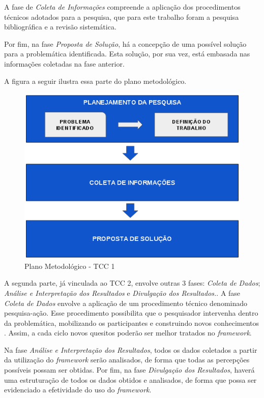 A fase de \textit{Coleta de Informações} compreende a aplicação dos procedimentos técnicos adotados para a pesquisa, que para este trabalho foram a pesquisa bibliográfica e a revisão sistemática.

Por fim, na fase \textit{Proposta de Solução}, há a concepção de uma possível solução para a problemática identificada. Esta solução, por sua vez, está embasada nas informações coletadas na fase anterior.

A figura a seguir ilustra essa parte do plano metodológico.

\begin{figure}[h]
\includegraphics[width=\textwidth]{figuras/planometodologico1.png}
\caption{Plano Metodológico - TCC 1}
\end{figure}

A segunda parte, já vinculada ao TCC 2, envolve outras 3 fases: \textit{Coleta de Dados}; \textit{Análise e Interpretação dos Resultados} e \textit{Divulgação dos Resultados.}.
A fase \textit{Coleta de Dados} envolve a aplicação de um procedimento técnico denominado pesquisa-ação. Esse procedimento possibilita que o pesquisador intervenha dentro da problemática, mobilizando os participantes e construindo novos conhecimentos \cite{pesquisa}. Assim, a cada ciclo novos quesitos poderão ser melhor tratados no \textit{framework}.

Na fase \textit{Análise e Interpretação dos Resultados}, todos os dados coletados a partir da utilização do \textit{framework} serão analisados, de forma que todas as percepções possíveis possam ser obtidas. Por fim, na fase \textit{Divulgação dos Resultados}, haverá uma estruturação de todos os dados obtidos e analisados, de forma que possa ser evidenciado a efetividade do uso do \textit{framework}.

